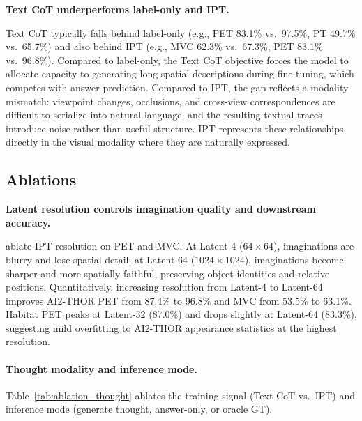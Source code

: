 \begin{takeawayblock}
    \textbf{Text CoT underperforms label-only and IPT.}
\end{takeawayblock}
Text CoT typically falls behind label-only (e.g., PET 83.1\% vs.\ 97.5\%, PT 49.7\% vs.\ 65.7\%) and also behind IPT (e.g., MVC 62.3\% vs.\ 67.3\%, PET 83.1\% vs.\ 96.8\%).
Compared to label-only, the Text CoT objective forces the model to allocate capacity to generating long spatial descriptions during fine-tuning, which competes with answer prediction.
Compared to IPT, the gap reflects a modality mismatch: viewpoint changes, occlusions, and cross-view correspondences are difficult to serialize into natural language, and the resulting textual traces introduce noise rather than useful structure. IPT represents these relationships directly in the visual modality where they are naturally expressed.
\vspace{-1em}
\subsection{Ablations}
\label{sec:exp_ablation}




\begin{takeawayblock}
    \textbf{Latent resolution controls imagination quality and downstream accuracy.}
\end{takeawayblock}
 ablate IPT resolution on PET and MVC.
At Latent-4 ($64\times64$), imaginations are blurry and lose spatial detail; at Latent-64 ($1024\times1024$), imaginations become sharper and more spatially faithful, preserving object identities and relative positions.
Quantitatively, increasing resolution from Latent-4 to Latent-64 improves AI2-THOR PET from 87.4\% to 96.8\% and MVC from 53.5\% to 63.1\%.
Habitat PET peaks at Latent-32 (87.0\%) and drops slightly at Latent-64 (83.3\%), suggesting mild overfitting to AI2-THOR appearance statistics at the highest resolution.


\vspace{-1em}
\paragraph{Thought modality and inference mode.}
Table~\ref{tab:ablation_thought} ablates the training signal (Text CoT vs.\ IPT) and inference mode (generate thought, answer-only, or oracle GT).

